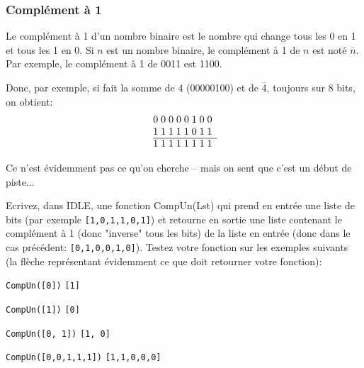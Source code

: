 \documentclass[12pt]{article}
\begin{document}
	\subsubsection*{Complément à 1}
	Le complément à 1 d'un nombre binaire est le nombre qui change tous les 0 en 1 et tous les 1 en 0.
	Si $n$ est un nombre binaire, le complément à 1 de $n$ est noté \textbf{$\overline{n}$}.
	Par exemple, le complément à 1 de 0011 est 1100.
	
	Donc, par exemple, si fait la somme de 4 (00000100) et de \textbf{$\overline{4}$}, toujours sur 8 bits, on obtient:
	\[
	\begin{array}{@{}r *{8}{@{\;}c}}
		& 0 & 0 & 0 & 0 & 0 & 1 & 0 & 0 \\
		& 1 & 1 & 1 & 1 & 1 & 0 & 1 & 1 \\
		\cline{2-9}
		& 1 & 1 & 1 & 1 & 1 & 1 & 1 & 1 \\
	\end{array}
	\]
	
	Ce n'est évidemment pas ce qu'on cherche -- mais on sent que c'est un début de piste...
	
	\begin{MonExo}
		Ecrivez, dans IDLE, une fonction CompUn(Lst) qui prend en entrée une liste de bits (par exemple \texttt{[1,0,1,1,0,1]}) et retourne en sortie une liste contenant le complément à 1 (donc "inverse" tous les bits) de la liste en entrée (donc dans le cas précédent: \texttt{[0,1,0,0,1,0]}). Testez votre fonction sur les exemples suivants (la flèche représentant évidemment ce que doit retourner votre fonction):
		\begin{alphenum}
			\item \texttt{CompUn([0])} \textrightarrow  \texttt{[1]}
			\item \texttt{CompUn([1])} \textrightarrow  \texttt{[0]}
			\item \texttt{CompUn([0, 1])} \textrightarrow  \texttt{[1, 0]}
			\item \texttt{CompUn([0,0,1,1,1])} \textrightarrow  \texttt{[1,1,0,0,0]}
		\end{alphenum}
	\end{MonExo}
	\begin{MaReponse}
	\end{MaReponse}
	
\end{document}
